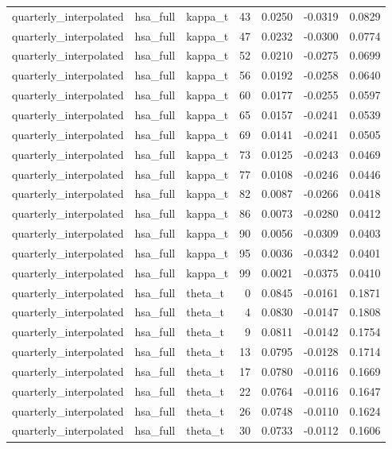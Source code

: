 \begin{tabular}{lllrrrr}
quarterly\_interpolated & hsa\_full & kappa\_t & 43 & 0.0250 & -0.0319 & 0.0829 \\
quarterly\_interpolated & hsa\_full & kappa\_t & 47 & 0.0232 & -0.0300 & 0.0774 \\
quarterly\_interpolated & hsa\_full & kappa\_t & 52 & 0.0210 & -0.0275 & 0.0699 \\
quarterly\_interpolated & hsa\_full & kappa\_t & 56 & 0.0192 & -0.0258 & 0.0640 \\
quarterly\_interpolated & hsa\_full & kappa\_t & 60 & 0.0177 & -0.0255 & 0.0597 \\
quarterly\_interpolated & hsa\_full & kappa\_t & 65 & 0.0157 & -0.0241 & 0.0539 \\
quarterly\_interpolated & hsa\_full & kappa\_t & 69 & 0.0141 & -0.0241 & 0.0505 \\
quarterly\_interpolated & hsa\_full & kappa\_t & 73 & 0.0125 & -0.0243 & 0.0469 \\
quarterly\_interpolated & hsa\_full & kappa\_t & 77 & 0.0108 & -0.0246 & 0.0446 \\
quarterly\_interpolated & hsa\_full & kappa\_t & 82 & 0.0087 & -0.0266 & 0.0418 \\
quarterly\_interpolated & hsa\_full & kappa\_t & 86 & 0.0073 & -0.0280 & 0.0412 \\
quarterly\_interpolated & hsa\_full & kappa\_t & 90 & 0.0056 & -0.0309 & 0.0403 \\
quarterly\_interpolated & hsa\_full & kappa\_t & 95 & 0.0036 & -0.0342 & 0.0401 \\
quarterly\_interpolated & hsa\_full & kappa\_t & 99 & 0.0021 & -0.0375 & 0.0410 \\
quarterly\_interpolated & hsa\_full & theta\_t & 0 & 0.0845 & -0.0161 & 0.1871 \\
quarterly\_interpolated & hsa\_full & theta\_t & 4 & 0.0830 & -0.0147 & 0.1808 \\
quarterly\_interpolated & hsa\_full & theta\_t & 9 & 0.0811 & -0.0142 & 0.1754 \\
quarterly\_interpolated & hsa\_full & theta\_t & 13 & 0.0795 & -0.0128 & 0.1714 \\
quarterly\_interpolated & hsa\_full & theta\_t & 17 & 0.0780 & -0.0116 & 0.1669 \\
quarterly\_interpolated & hsa\_full & theta\_t & 22 & 0.0764 & -0.0116 & 0.1647 \\
quarterly\_interpolated & hsa\_full & theta\_t & 26 & 0.0748 & -0.0110 & 0.1624 \\
quarterly\_interpolated & hsa\_full & theta\_t & 30 & 0.0733 & -0.0112 & 0.1606 \\

\end{tabular}
